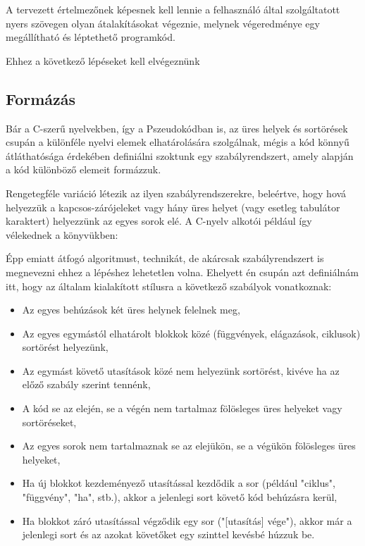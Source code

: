 A tervezett értelmezőnek képesnek kell lennie a felhasználó által szolgáltatott nyers szövegen olyan átalakításokat végeznie, melynek végeredménye egy megállítható és léptethető programkód.

Ehhez a következő lépéseket kell elvégeznünk

\subsection{Formázás}
\label{sec:formatting}

Bár a C-szerű nyelvekben, így a Pszeudokódban is, az üres helyek és sortörések csupán a különféle nyelvi elemek elhatárolására szolgálnak, mégis a kód könnyű átláthatósága érdekében definiálni szoktunk egy szabályrendszert, amely alapján a kód különböző elemeit formázzuk.

Rengetegféle variáció létezik az ilyen szabályrendszerekre, beleértve, hogy hová helyezzük a kapcsos-zárójeleket vagy hány üres helyet (vagy esetleg tabulátor karaktert) helyezzünk az egyes sorok elé. A C-nyelv alkotói például így vélekednek a könyvükben:

\cite{kr}

Épp emiatt átfogó algoritmust, technikát, de akárcsak szabályrendszert is megnevezni ehhez a lépéshez lehetetlen volna. Ehelyett én csupán azt definiálnám itt, hogy az általam kialakított stílusra a következő szabályok vonatkoznak:

\begin{itemize}
    \item Az egyes behúzások két üres helynek felelnek meg,
    \item Az egyes egymástól elhatárolt blokkok közé (függvények, elágazások, ciklusok) sortörést helyezünk,
    \item Az egymást követő utasítások közé nem helyezünk sortörést, kivéve ha az előző szabály szerint tennénk,
    \item A kód se az elején, se a végén nem tartalmaz fölösleges üres helyeket vagy sortöréseket,
    \item Az egyes sorok nem tartalmaznak se az elejükön, se a végükön fölösleges üres helyeket,
    \item Ha új blokkot kezdeményező utasítással kezdődik a sor (például "ciklus", "függvény", "ha", stb.), akkor a jelenlegi sort követő kód behúzásra kerül,
    \item Ha blokkot záró utasítással végződik egy sor ("[utasítás] vége"), akkor már a jelenlegi sort és az azokat követőket egy szinttel kevésbé húzzuk be.
\end{itemize}

